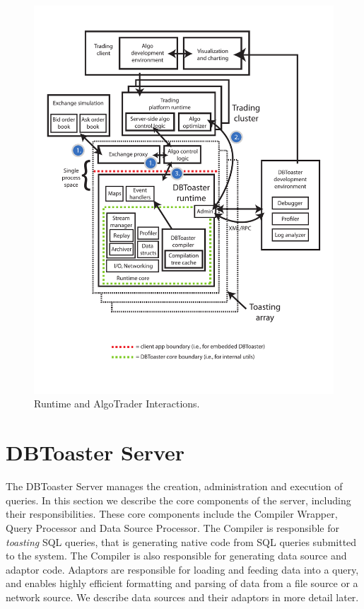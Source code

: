\documentclass[14pt]{article}
\begin{document}
\begin{figure}
  \includegraphics[width=4.50in]{figures/finapp.pdf}
  \caption{Runtime and AlgoTrader Interactions.}
  \label{fig:overview}
\end{figure}



\section{DBToaster Server}

The DBToaster Server manages the creation, administration and execution of
queries. In this section we describe the core components of the server,
including their responsibilities. These core components include the Compiler
Wrapper, Query Processor and Data Source Processor. The Compiler is responsible
for \textit{toasting} SQL queries, that is generating native code from SQL
queries submitted to the system. The Compiler is also responsible for generating
data source and adaptor code. Adaptors are responsible for loading and feeding
data into a query, and enables highly efficient formatting and parsing of data
from a file source or a network source. We describe data sources and their
adaptors in more detail later.
\end{document}
